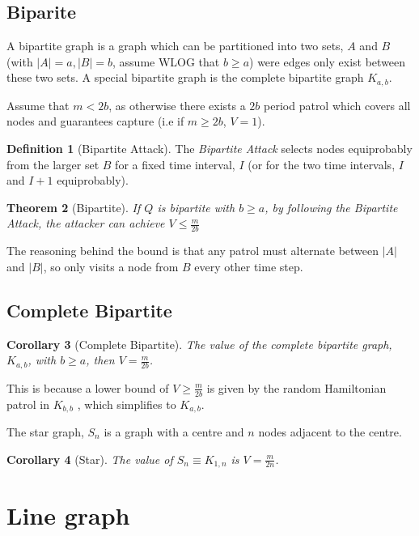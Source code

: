 \documentclass[a4paper,10pt]{article}
\newtheorem{theorem}{Theorem}[section]
\newtheorem{corollary}[theorem]{Corollary}
\theoremstyle{definition}
\newtheorem{definition}[theorem]{Definition}
\theoremstyle{definition}
\theoremstyle{remark}
\theoremstyle{definition}
\begin{document}
\subsection{Biparite}
A bipartite graph is a graph which can be partitioned into two sets, $A$ and $B$ (with $|A|=a,|B|=b$, assume WLOG that $b \geq a$) were edges only exist between these two sets. A special bipartite graph is the complete bipartite graph $K_{a,b}$.

Assume that $m < 2b$, as otherwise there exists a $2b$ period patrol which covers all nodes and guarantees capture (i.e if $m \geq 2b$, $V=1$).

\begin{definition}[Bipartite Attack]
The \textit{Bipartite Attack} selects nodes equiprobably from the larger set $B$ for a fixed time interval, $I$ (or for the two time intervals, $I$ and $I+1$ equiprobably).
\end{definition}

\begin{theorem}[Bipartite]
If $Q$ is bipartite with $b \geq a$, by following the Bipartite Attack, the attacker can achieve $V \leq \frac{m}{2b}$
\end{theorem}

The reasoning behind the bound is that any patrol must alternate between $|A|$ and $|B|$, so only visits a node from $B$ every other time step. 

\subsection{Complete Bipartite}
\begin{corollary}[Complete Bipartite]
The value of the complete bipartite graph, $K_{a,b}$, with $b \geq a$, then $V=\frac{m}{2b}$.
\end{corollary}

This is because a lower bound of $V \geq \frac{m}{2b}$ is given by the random Hamiltonian patrol in $K_{b,b}$ , which simplifies to $K_{a,b}$.

The star graph, $S_{n}$ is a graph with a centre and $n$ nodes adjacent to the centre.

\begin{corollary}[Star]
The value of $S_{n} \equiv K_{1,n}$ is $V=\frac{m}{2n}$.
\end{corollary}

\section{Line graph}
\end{document}

